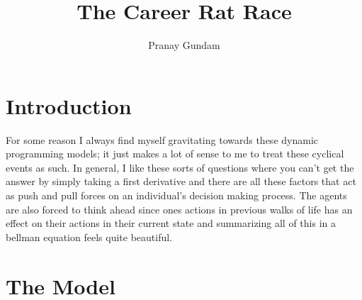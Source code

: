 \documentclass[11pt,english]{article}
\title{\textbf{The Career Rat Race}}
\author{Pranay Gundam}
\begin{document}
\maketitle


\section*{Introduction}

For some reason I always find myself gravitating towards these dynamic programming models; it just makes a lot of sense to me to treat these cyclical events as such.  In general, I like these sorts of questions where you can't get the answer by simply taking a first derivative and there are all these factors that act as push and pull forces on an individual's decision making process. The agents are also forced to think ahead since ones actions in previous walks of life has an effect on their actions in their current state and summarizing all of this in a bellman equation feels quite beautiful.

\section*{The Model}
\end{document}
